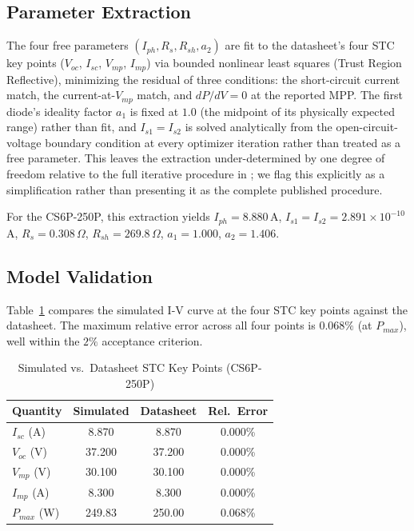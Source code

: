 \subsection{Parameter Extraction}
\label{sec:parameter-extraction}
The four free parameters $(I_{ph}, R_s, R_{sh}, a_2)$ are fit to the
datasheet's four STC key points ($V_{oc}$, $I_{sc}$, $V_{mp}$, $I_{mp}$) via
bounded nonlinear least squares (Trust Region Reflective), minimizing the
residual of three conditions: the short-circuit current match, the
current-at-$V_{mp}$ match, and $dP/dV=0$ at the reported MPP. The first
diode's ideality factor $a_1$ is fixed at $1.0$ (the midpoint of its
physically expected range) rather than fit, and $I_{s1}=I_{s2}$ is solved
analytically from the open-circuit-voltage boundary condition at every
optimizer iteration rather than treated as a free parameter. This leaves
the extraction under-determined by one degree of freedom relative to the
full iterative procedure in \cite{ishaque2011simple}; we flag this
explicitly as a simplification rather than presenting it as the complete
published procedure.

For the CS6P-250P, this extraction yields $I_{ph}=8.880\,$A,
$I_{s1}=I_{s2}=2.891\times10^{-10}\,$A, $R_s=0.308\,\Omega$,
$R_{sh}=269.8\,\Omega$, $a_1=1.000$, $a_2=1.406$.

\subsection{Model Validation}
\label{sec:model-validation}
Table~\ref{tab:validation} compares the simulated I-V curve at the four STC
key points against the datasheet. The maximum relative error across all
four points is $0.068\%$ (at $P_{max}$), well within the $2\%$ acceptance
criterion.

\begin{table}[htbp]
\centering
\caption{Simulated vs.\ Datasheet STC Key Points (CS6P-250P)}
\label{tab:validation}
\begin{tabular}{@{}lccc@{}}
\toprule
Quantity & Simulated & Datasheet & Rel.\ Error \\
\midrule
$I_{sc}$ (A)  & 8.870  & 8.870  & 0.000\% \\
$V_{oc}$ (V)  & 37.200 & 37.200 & 0.000\% \\
$V_{mp}$ (V)  & 30.100 & 30.100 & 0.000\% \\
$I_{mp}$ (A)  & 8.300  & 8.300  & 0.000\% \\
$P_{max}$ (W) & 249.83 & 250.00 & 0.068\% \\
\bottomrule
\end{tabular}
\end{table}

